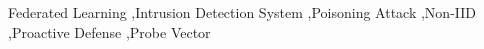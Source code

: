 \documentclass[5p,times]{elsarticle}
\begin{document}








\begin{abstract}
..... tom tat bai bao....
 

 
\end{abstract}


\begin{keyword}
Federated Learning \sep Intrusion Detection System \sep Poisoning Attack \sep Non-IID  \sep Proactive Defense \sep Probe Vector
\end{keyword}




\end{document}
